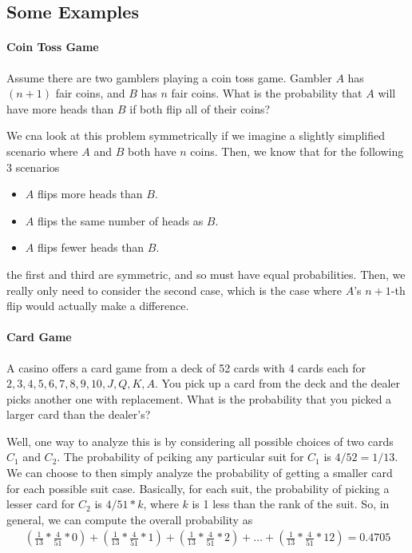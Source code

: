 \documentclass[10pt,a4paper]{article}
\begin{document}
\subsection*{Some Examples}

\paragraph{Coin Toss Game} Assume there are two gamblers playing a coin toss game. Gambler $A$ has $(n+1)$ fair coins, and $B$ has $n$ fair coins. What is the probability that $A$ will have more heads than $B$ if both flip all of their coins?

We cna look at this problem symmetrically if we imagine a slightly simplified scenario where $A$ and $B$ both have $n$ coins. Then, we know that for the following 3 scenarios
\begin{itemize}
    \item $A$ flips more heads than $B$.
    \item $A$ flips the same number of heads as $B$.
    \item $A$ flips fewer heads than $B$. 
\end{itemize}
the first and third are symmetric, and so must have equal probabilities. Then, we really only need to consider the second case, which is the case where $A$'s $n+1$-th flip would actually make a difference.

\paragraph*{Card Game} A casino offers a card game from a deck of 52 cards with 4 cards each for $2,3,4,5,6,7,8,9,10,J,Q,K,A$. You pick up a card from the deck and the dealer picks another one with replacement. What is the probability that you picked a larger card than the dealer's?

Well, one way to analyze this is by considering all possible choices of two cards $C_1$ and $C_2$. The probability of pciking any particular suit for $C_1$ is $4/52 = 1/13$. We can choose to then simply analyze the probability of getting a smaller card for each possible suit case. Basically, for each suit, the probability of picking a lesser card for $C_2$ is $4/51 * k$, where $k$ is 1 less than the rank of the suit. So, in general, we can compute the overall probability as
\begin{align*}
    \left(\frac{1}{13}*\frac{4}{51}*0\right) + \left(\frac{1}{13}*\frac{4}{51}*1\right) + \left(\frac{1}{13}*\frac{4}{51}*2\right) + \dots + \left(\frac{1}{13}*\frac{4}{51}*12\right) = 0.4705
\end{align*}
\end{document}
